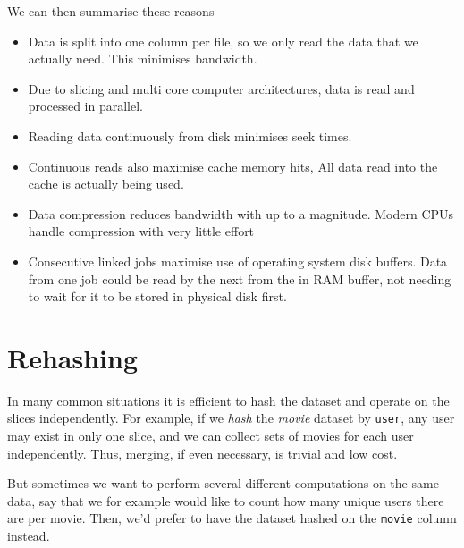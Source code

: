 \documentclass[a4paper]{article}
\begin{document}
We can then summarise these reasons
\begin{itemize}
  \item[] Data is split into one column per file, so we only read the
    data that we actually need.  This minimises bandwidth.
    
  \item[] Due to slicing and multi core computer architectures, data
    is read and processed in parallel.

  \item[] Reading data continuously from disk minimises seek times.

  \item[] Continuous reads also maximise cache memory hits, All data
    read into the cache is actually being used.

  \item[] Data compression reduces bandwidth with up to a magnitude.
    Modern CPUs handle compression with very little effort

  \item[] Consecutive linked jobs maximise use of operating system
    disk buffers.  Data from one job could be read by the next from
    the in RAM buffer, not needing to wait for it to be stored in
    physical disk first.
\end{itemize}













\clearpage


\section{Rehashing}

In many common situations it is efficient to hash the dataset and
operate on the slices independently.  For example, if we \textsl{hash}
the \textsl{movie} dataset by \texttt{user}, any user may exist in
only one slice, and we can collect sets of movies for each user
independently.  Thus, merging, if even necessary, is trivial and low
cost.

But sometimes we want to perform several different computations on the
same data, say that we for example would like to count how many unique
users there are per movie.  Then, we'd prefer to have the dataset
hashed on the \texttt{movie} column instead.
\end{document}
